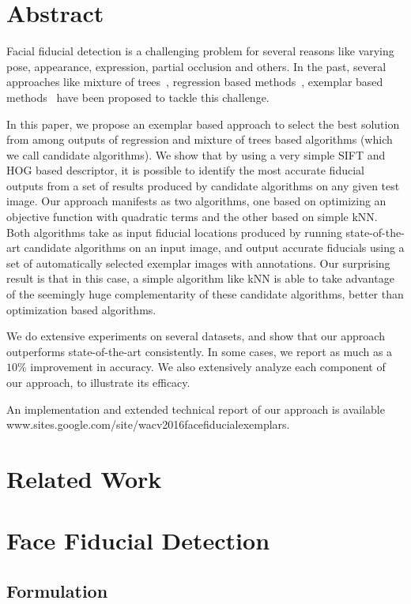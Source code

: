 \section{Abstract}
Facial fiducial detection is a challenging problem for several reasons
 like varying pose, appearance, expression, partial occlusion and others.
In the past, several approaches like mixture of trees~\cite{xhuCVPR12_wild}, regression based
methods~\cite{artizzzuICCV13_COFW},  
exemplar based methods~\cite{kumarPAMI13_faceExem} have been proposed to tackle this challenge.

In this paper, we propose an exemplar based approach to select the best solution from among outputs of
regression and mixture of trees based algorithms (which we call candidate algorithms). 
We show that by using a very simple SIFT and
HOG based descriptor, it is possible to identify the most accurate
fiducial outputs from a set of results produced by candidate
algorithms on any given test image. Our approach manifests as two algorithms, one 
based on optimizing an objective function with quadratic terms and the other based
on simple kNN. Both algorithms take as input
fiducial locations produced by running state-of-the-art
candidate algorithms on an input image, and output
accurate fiducials using a set of automatically selected exemplar images with annotations.
Our surprising result is that in this case, a simple algorithm like kNN is able to take
advantage of the seemingly huge complementarity of these candidate algorithms,
better than optimization based algorithms.

We do extensive experiments on several datasets, and show that our approach
outperforms state-of-the-art consistently. In some cases, we report as much
as a $10\%$ improvement in accuracy. We also extensively analyze each
component of our approach, to illustrate its efficacy.

An implementation and extended technical report of our approach is available www.sites.google.com/site/wacv2016facefiducialexemplars.

\section{Related Work}

\section{Face Fiducial Detection}

\subsection{Formulation}

